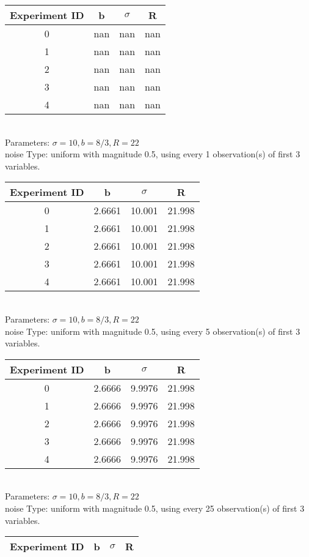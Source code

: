 \begin{multicols}{3}
\begin{tabular}{cccc}
\hline Experiment ID & b & $\sigma$ & R \\ \hline 
0 & nan & nan & nan\\ \hline 
 1 & nan & nan & nan\\ \hline 
 2 & nan & nan & nan\\ \hline 
 3 & nan & nan & nan\\ \hline 
 4 & nan & nan & nan\\ \hline 
 \end{tabular}\\
Parameters: $\sigma=10, b=8/3, R=22$\\
noise Type: uniform with magnitude 0.5, using every 1 observation(s) of first 3 variables.\\
\begin{tabular}{cccc}
\hline Experiment ID & b & $\sigma$ & R \\ \hline 
0 & 2.6661 & 10.001 & 21.998\\ \hline 
 1 & 2.6661 & 10.001 & 21.998\\ \hline 
 2 & 2.6661 & 10.001 & 21.998\\ \hline 
 3 & 2.6661 & 10.001 & 21.998\\ \hline 
 4 & 2.6661 & 10.001 & 21.998\\ \hline 
 \end{tabular}\\
Parameters: $\sigma=10, b=8/3, R=22$\\
noise Type: uniform with magnitude 0.5, using every 5 observation(s) of first 3 variables.\\
\begin{tabular}{cccc}
\hline Experiment ID & b & $\sigma$ & R \\ \hline 
0 & 2.6666 & 9.9976 & 21.998\\ \hline 
 1 & 2.6666 & 9.9976 & 21.998\\ \hline 
 2 & 2.6666 & 9.9976 & 21.998\\ \hline 
 3 & 2.6666 & 9.9976 & 21.998\\ \hline 
 4 & 2.6666 & 9.9976 & 21.998\\ \hline 
 \end{tabular}\\
Parameters: $\sigma=10, b=8/3, R=22$\\
noise Type: uniform with magnitude 0.5, using every 25 observation(s) of first 3 variables.\\
\begin{tabular}{cccc}
\hline Experiment ID & b & $\sigma$ & R \\ \hline 

\end{tabular}
\end{multicols}
